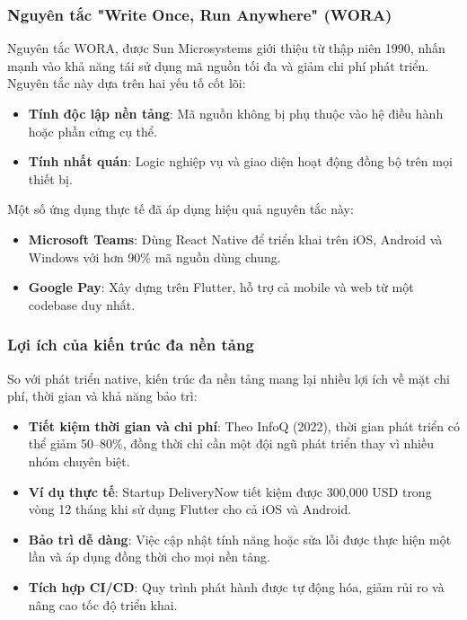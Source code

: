 \subsubsection{Nguyên tắc "Write Once, Run Anywhere" (WORA)}
\begin{flushleft}
    \hspace*{0.8cm}Nguyên tắc WORA, được Sun Microsystems giới thiệu từ thập niên 1990, nhấn mạnh vào khả năng tái sử dụng mã nguồn tối đa và giảm chi phí phát triển. Nguyên tắc này dựa trên hai yếu tố cốt lõi:
    \setlength{\leftmargini}{1.5cm}
    \begin{itemize}
        \item \textbf{Tính độc lập nền tảng}: Mã nguồn không bị phụ thuộc vào hệ điều hành hoặc phần cứng cụ thể.
        \item \textbf{Tính nhất quán}: Logic nghiệp vụ và giao diện hoạt động đồng bộ trên mọi thiết bị.
    \end{itemize}
\end{flushleft}

\begin{flushleft}
    \hspace*{0.8cm}Một số ứng dụng thực tế đã áp dụng hiệu quả nguyên tắc này:
    \setlength{\leftmargini}{1.5cm}
    \begin{itemize}
        \item \textbf{Microsoft Teams}: Dùng React Native để triển khai trên iOS, Android và Windows với hơn 90\% mã nguồn dùng chung.
        \item \textbf{Google Pay}: Xây dựng trên Flutter, hỗ trợ cả mobile và web từ một codebase duy nhất.
    \end{itemize}
\end{flushleft}

\subsubsection{Lợi ích của kiến trúc đa nền tảng}
\begin{flushleft}
    \hspace*{0.8cm}So với phát triển native, kiến trúc đa nền tảng mang lại nhiều lợi ích về mặt chi phí, thời gian và khả năng bảo trì:
    \setlength{\leftmargini}{1.5cm}
    \begin{itemize}
        \item \textbf{Tiết kiệm thời gian và chi phí}: Theo InfoQ (2022), thời gian phát triển có thể giảm 50–80\%, đồng thời chỉ cần một đội ngũ phát triển thay vì nhiều nhóm chuyên biệt.
        \item \textbf{Ví dụ thực tế}: Startup DeliveryNow tiết kiệm được 300,000 USD trong vòng 12 tháng khi sử dụng Flutter cho cả iOS và Android.
        \item \textbf{Bảo trì dễ dàng}: Việc cập nhật tính năng hoặc sửa lỗi được thực hiện một lần và áp dụng đồng thời cho mọi nền tảng.
        \item \textbf{Tích hợp CI/CD}: Quy trình phát hành được tự động hóa, giảm rủi ro và nâng cao tốc độ triển khai.
    \end{itemize}
\end{flushleft}


